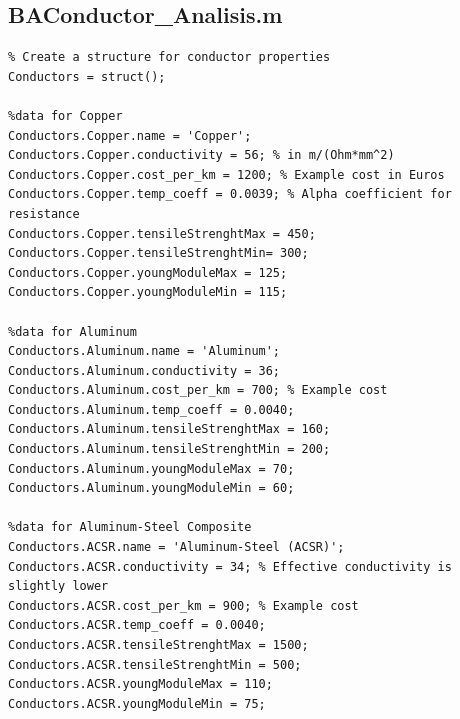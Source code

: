 \documentclass[12pt, a4paper]{article}
\begin{document}
\subsection{BAConductor\_Analisis.m}
\begin{lstlisting}
% Create a structure for conductor properties
Conductors = struct();

%data for Copper
Conductors.Copper.name = 'Copper';
Conductors.Copper.conductivity = 56; % in m/(Ohm*mm^2)
Conductors.Copper.cost_per_km = 1200; % Example cost in Euros
Conductors.Copper.temp_coeff = 0.0039; % Alpha coefficient for resistance
Conductors.Copper.tensileStrenghtMax = 450; 
Conductors.Copper.tensileStrenghtMin= 300;
Conductors.Copper.youngModuleMax = 125;
Conductors.Copper.youngModuleMin = 115;

%data for Aluminum
Conductors.Aluminum.name = 'Aluminum';
Conductors.Aluminum.conductivity = 36;
Conductors.Aluminum.cost_per_km = 700; % Example cost
Conductors.Aluminum.temp_coeff = 0.0040;
Conductors.Aluminum.tensileStrenghtMax = 160;
Conductors.Aluminum.tensileStrenghtMin = 200;
Conductors.Aluminum.youngModuleMax = 70;
Conductors.Aluminum.youngModuleMin = 60;

%data for Aluminum-Steel Composite
Conductors.ACSR.name = 'Aluminum-Steel (ACSR)';
Conductors.ACSR.conductivity = 34; % Effective conductivity is slightly lower
Conductors.ACSR.cost_per_km = 900; % Example cost
Conductors.ACSR.temp_coeff = 0.0040;
Conductors.ACSR.tensileStrenghtMax = 1500;
Conductors.ACSR.tensileStrenghtMin = 500;
Conductors.ACSR.youngModuleMax = 110;
Conductors.ACSR.youngModuleMin = 75;
\end{lstlisting}
\end{document}
